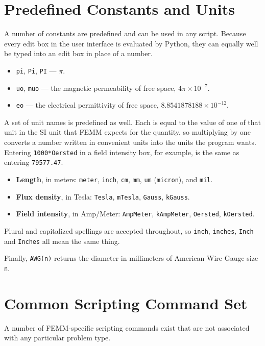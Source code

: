 \section{Predefined Constants and Units}

A number of constants are predefined and can be used in any script.
Because every edit box in the user interface is evaluated by Python, they
can equally well be typed into an edit box in place of a number.

\begin{itemize}
\item{\tt pi}, {\tt Pi}, {\tt PI} --- $\pi$.
\item{\tt uo}, {\tt muo} --- the magnetic permeability of free space,
$4 \pi \times 10^{-7}$.
\item{\tt eo} --- the electrical permittivity of free space,
$8.8541878188 \times 10^{-12}$.
\end{itemize}

A set of unit names is predefined as well.  Each is equal to the value of
one of that unit in the SI unit that FEMM expects for the quantity, so
multiplying by one converts a number written in convenient units into the
units the program wants.  Entering {\tt 1000*Oersted} in a field
intensity box, for example, is the same as entering {\tt 79577.47}.

\begin{itemize}
\item{\bf Length}, in meters: {\tt meter}, {\tt inch}, {\tt cm},
{\tt mm}, {\tt um} ({\tt micron}), and {\tt mil}.
\item{\bf Flux density}, in Tesla: {\tt Tesla}, {\tt mTesla},
{\tt Gauss}, {\tt kGauss}.
\item{\bf Field intensity}, in Amp/Meter: {\tt AmpMeter},
{\tt kAmpMeter}, {\tt Oersted}, {\tt kOersted}.
\end{itemize}

Plural and capitalized spellings are accepted throughout, so
{\tt inch}, {\tt inches}, {\tt Inch} and {\tt Inches} all mean the same
thing.

Finally, {\tt AWG(n)} returns the diameter in millimeters of American
Wire Gauge size {\tt n}.

\section{Common Scripting Command Set}

A number of FEMM-specific scripting commands exist that are not
associated with any particular problem type.

